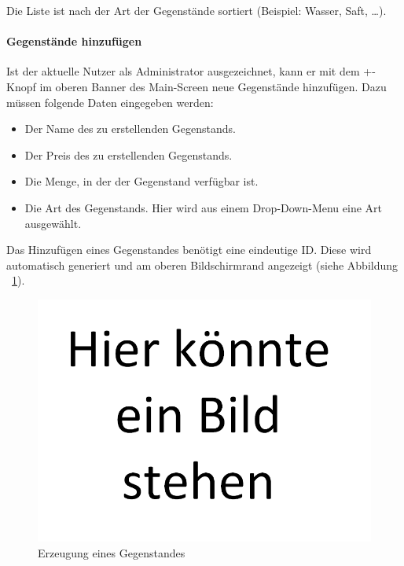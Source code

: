 \documentclass{scrartcl}
\begin{document}
		Die Liste ist nach der Art der Gegenstände sortiert (Beispiel: Wasser, Saft, \ldots).
		
		\paragraph*{Gegenstände hinzufügen}
		Ist der aktuelle Nutzer als Administrator ausgezeichnet, kann er mit dem +-Knopf im oberen Banner des Main-Screen neue Gegenstände hinzufügen. Dazu müssen folgende Daten eingegeben werden:
		
		\begin{itemize}
			\item Der Name des zu erstellenden Gegenstands.
			
			\item Der Preis des zu erstellenden Gegenstands.
			
			\item Die Menge, in der der Gegenstand verfügbar ist.
			
			\item Die Art des Gegenstands. Hier wird aus einem Drop-Down-Menu eine Art ausgewählt.
		\end{itemize}
	
		Das Hinzufügen eines Gegenstandes benötigt eine eindeutige ID. Diese wird automatisch generiert und am oberen Bildschirmrand angezeigt (siehe Abbildung ~\ref{createItem}).
	
		\begin{figure}[!h]
			\centering
			\includegraphics[scale=0.5]{./figures/placeholder.png}
			\caption{Erzeugung eines Gegenstandes}
			\label{createItem}
		\end{figure}
	
\end{document}
